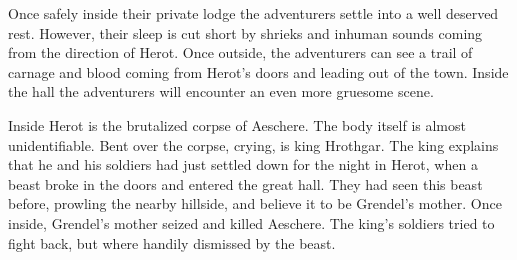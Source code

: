 \documentclass[10pt,twoside,twocolumn,openany]{book}
\begin{document}
Once safely inside their private lodge the adventurers settle into a well deserved rest. However, their sleep is cut short by shrieks and inhuman sounds coming from the direction of Herot. Once outside, the adventurers can see a trail of carnage and blood coming from Herot's doors and leading out of the town. Inside the hall the adventurers will encounter an even more gruesome scene.

Inside Herot is the brutalized corpse of Aeschere. The body itself is almost unidentifiable. Bent over the corpse, crying, is king Hrothgar. The king explains that he and his soldiers had just settled down for the night in Herot, when a beast broke in the doors and entered the great hall. They had seen this beast before, prowling the nearby hillside, and believe it to be Grendel's mother. Once inside, Grendel's mother seized and killed Aeschere. The king's soldiers tried to fight back, but where handily dismissed by the beast.
\end{document}
